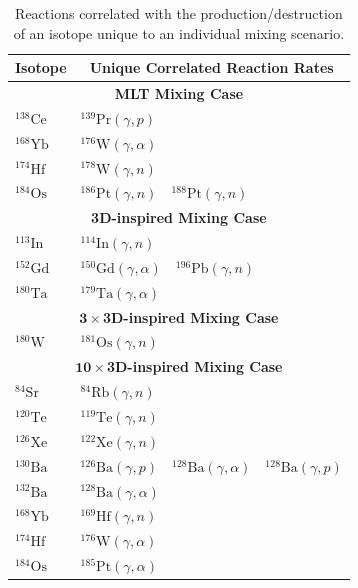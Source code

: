 \begin{table}
\caption{Reactions correlated with the production/destruction of an isotope unique to an individual mixing scenario.
\label{tab:unique_rates}}
\begin{tabular}{l|l}
    \toprule
    \multicolumn{1}{c}{\textbf{Isotope}} & \multicolumn{1}{c}{\textbf{Unique Correlated Reaction Rates}} \\
    \toprule
    \multicolumn{2}{c}{\textbf{MLT Mixing Case}} \\
    \midrule
    $^{138}\mathrm{Ce}$ & $^{139}\mathrm{Pr}(\gamma,p)$ \\
    $^{168}\mathrm{Yb}$ & $^{176}\mathrm{W}(\gamma,\alpha)$ \\
    $^{174}\mathrm{Hf}$ & $^{178}\mathrm{W}(\gamma,n)$ \\
    $^{184}\mathrm{Os}$ & $^{186}\mathrm{Pt}(\gamma,n)$~~$^{188}\mathrm{Pt}(\gamma,n)$ \\
    \midrule
    \multicolumn{2}{c}{\textbf{3D-inspired Mixing Case}} \\
    \midrule
    $^{113}\mathrm{In}$ & $^{114}\mathrm{In}(\gamma,n)$ \\
    $^{152}\mathrm{Gd}$ & $^{150}\mathrm{Gd}(\gamma,\alpha)$~~$^{196}\mathrm{Pb}(\gamma,n)$ \\
    $^{180}\mathrm{Ta}$ & $^{179}\mathrm{Ta}(\gamma,\alpha)$ \\
    \midrule
    \multicolumn{2}{c}{$\mathbf{3\times}$\textbf{3D-inspired Mixing Case}} \\
    \midrule
    $^{180}\mathrm{W}$ & $^{181}\mathrm{Os}(\gamma,n)$ \\
    \midrule
    \multicolumn{2}{c}{$\mathbf{10\times}$\textbf{3D-inspired Mixing Case}} \\
    \midrule
    $^{84}\mathrm{Sr}$ & $^{84}\mathrm{Rb}(\gamma,n)$ \\
    $^{120}\mathrm{Te}$ & $^{119}\mathrm{Te}(\gamma,n)$ \\
    $^{126}\mathrm{Xe}$ & $^{122}\mathrm{Xe}(\gamma,n)$ \\
    $^{130}\mathrm{Ba}$ & $^{126}\mathrm{Ba}(\gamma,p)$~~$^{128}\mathrm{Ba}(\gamma,\alpha)$~~$^{128}\mathrm{Ba}(\gamma,p)$ \\
    $^{132}\mathrm{Ba}$ & $^{128}\mathrm{Ba}(\gamma,\alpha)$ \\
    $^{168}\mathrm{Yb}$ & $^{169}\mathrm{Hf}(\gamma,n)$ \\
    $^{174}\mathrm{Hf}$ & $^{176}\mathrm{W}(\gamma,\alpha)$ \\
    $^{184}\mathrm{Os}$ & $^{185}\mathrm{Pt}(\gamma,\alpha)$ \\

\end{tabular}
\end{table}
